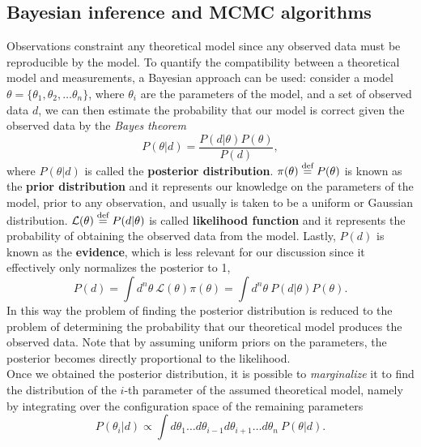 \subsection{Bayesian inference and MCMC algorithms}
Observations constraint any theoretical model since any observed data must be reproducible by the model. To quantify the compatibility between a theoretical model and measurements, a Bayesian approach can be used: consider a model $\theta=\{\theta_1,\theta_2,\dots\theta_n\}$, where $\theta_i$ are the parameters of the model, and a set of observed data $d$, we can then estimate the probability that our model is correct given the observed data by the \emph{Bayes theorem}
\begin{equation}
    P(\theta|d)=\frac{P(d|\theta)P(\theta)}{P(d)},
\end{equation}
where $P(\theta|d)$ is called the \textbf{posterior distribution}. $\pi(\theta)\stackrel{\text{def}}{=} P(\theta)$ is known as the \textbf{prior distribution} and it represents our knowledge on the parameters of the model, prior to any observation, and usually is taken to be a uniform or Gaussian distribution.  $\mathcal{L}(\theta)\stackrel{\text{def}}{=} P(d|\theta)$ is called \textbf{likelihood function} and it represents the probability of obtaining the observed data from the model. Lastly, $P(d)$ is known as the \textbf{evidence}, which is less relevant for our discussion since it effectively only normalizes the posterior to 1, 
$$P(d)=\int d^n\theta\ \mathcal{L}(\theta)\pi(\theta)=\int d^n\theta\ P(d|\theta)P(\theta).$$
In this way the problem of finding the posterior distribution is reduced to the problem of determining the probability that our theoretical model produces the observed data. Note that by  assuming uniform priors on the parameters, the posterior becomes directly proportional to the likelihood.\\ 
Once we obtained the posterior distribution, it is possible to \emph{marginalize} it to find the distribution of the $i$-th parameter of the assumed theoretical model, namely by integrating over the configuration space of the remaining parameters
$$P(\theta_i|d)\propto\int d\theta_1\dots d\theta_{i-1}d\theta_{i+1}\dots d\theta_n\ P(\theta|d). $$

